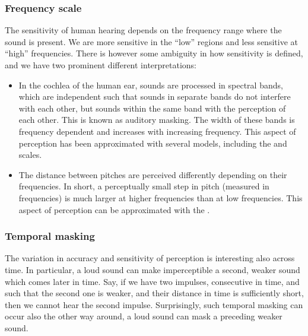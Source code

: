 \documentclass[letterpaper,10pt,english]{jupyterBook}
\begin{document}
\subsubsection{Frequency scale}
\label{\detokenize{Transmission/Perceptual_modelling_in_speech_and_audio_coding:frequency-scale}}
\sphinxAtStartPar
The sensitivity of human hearing depends on the frequency range where
the sound is present. We are more sensitive in the “low” regions and
less sensitive at “high” frequencies. There is however some ambiguity in
how sensitivity is defined, and we have two prominent different
interpretations:
\begin{itemize}
\item {} 
\sphinxAtStartPar
In the cochlea of the human ear, sounds are processed in spectral
bands, which are independent such that sounds in separate bands do
not interfere with each other, but sounds within the same band  with the perception of each other. This is known as
auditory masking. The width of these bands is frequency dependent
and increases with increasing frequency. This aspect of perception
has been approximated with several models, including the
 and
scales.

\item {} 
\sphinxAtStartPar
The distance between pitches are perceived differently depending on
their frequencies. In short, a perceptually small step in pitch
(measured in frequencies) is much larger at higher frequencies than
at low frequencies. This aspect of perception can be approximated
with the .

\end{itemize}


\subsubsection{Temporal masking}
\label{\detokenize{Transmission/Perceptual_modelling_in_speech_and_audio_coding:temporal-masking}}
\sphinxAtStartPar
The variation in accuracy and sensitivity of perception is interesting
also across time. In particular, a loud sound can make imperceptible a
second, weaker sound which comes later in time. Say, if we have two
impulses, consecutive in time, and such that the second one is weaker,
and their distance in time is sufficiently short, then we cannot hear
the second impulse. Surprisingly, such temporal masking can occur also
the other way around, a  loud sound can mask a preceding weaker
sound.
\end{document}
